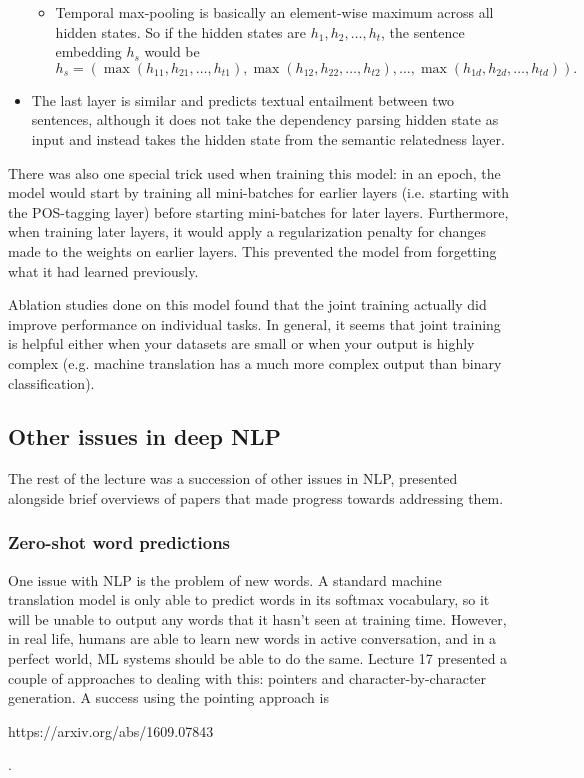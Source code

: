 \begin{itemize}
\begin{itemize}
\item Temporal max-pooling is basically an element-wise maximum across all hidden states. So if the hidden states are $h_1, h_2, \dots, h_t$, the sentence embedding $h_s$ would be
$$h_s = \left(\max\left(h_{11}, h_{21}, \dots, h_{t1}\right), \max\left(h_{12}, h_{22}, \dots, h_{t2}\right), \dots, \max\left(h_{1d}, h_{2d}, \dots, h_{td}\right)\right).$$
\end{itemize}
\item The last layer is similar and predicts textual entailment between two sentences, although it does not take the dependency parsing hidden state as input and instead takes the hidden state from the semantic relatedness layer.
\end{itemize}
There was also one special trick used when training this model: in an epoch, the model would start by training all mini-batches for earlier layers (i.e. starting with the POS-tagging layer) before starting mini-batches for later layers. Furthermore, when training later layers, it would apply a regularization penalty for changes made to the weights on earlier layers. This prevented the model from forgetting what it had learned previously.

Ablation studies done on this model found that the joint training actually did improve performance on individual tasks. In general, it seems that joint training is helpful either when your datasets are small or when your output is highly complex (e.g. machine translation has a much more complex output than binary classification).

\subsection{Other issues in deep NLP}
The rest of the lecture was a succession of other issues in NLP, presented alongside brief overviews of papers that made progress towards addressing them.

\subsubsection{Zero-shot word predictions}
One issue with NLP is the problem of new words. A standard machine translation model is only able to predict words in its softmax vocabulary, so it will be unable to output any words that it hasn't seen at training time. However, in real life, humans are able to learn new words in active conversation, and in a perfect world, ML systems should be able to do the same. Lecture 17 presented a couple of approaches to dealing with this: pointers and character-by-character generation. A success using the pointing approach is \begin{tt}https://arxiv.org/abs/1609.07843\end{tt}.


